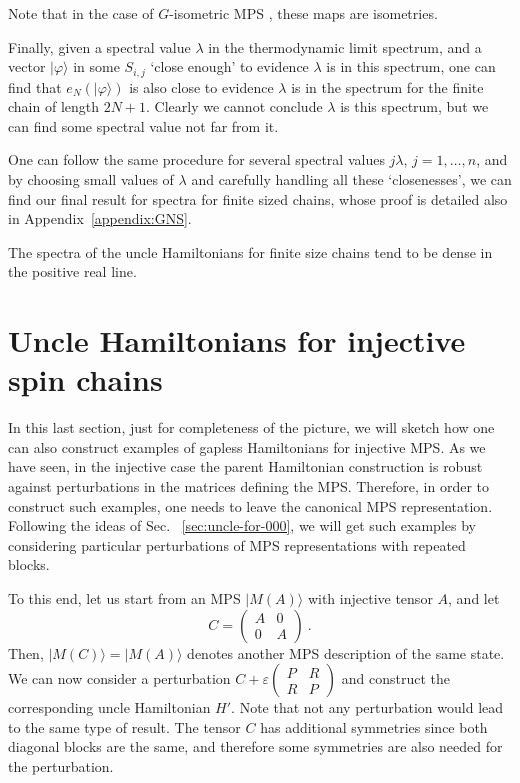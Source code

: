 \documentclass[cmp]{svjour}
\newcommand{\ket}[1]{|#1\rangle}
\begin{document}
Note that in the case of $G$-isometric MPS \cite{schuch:peps-sym}, these maps are isometries.




Finally, given a spectral value $\lambda$ in the thermodynamic limit spectrum, and a vector $\ket{\varphi}$ in some $S_{i,j}$ `close enough' to evidence $\lambda$ is in this spectrum, one can find that $e_N(\ket{\varphi})$ is also close to evidence $\lambda$ is in the spectrum for the finite chain of length $2N+1$. Clearly we cannot conclude $\lambda$ is this spectrum, but we can find some spectral value not far from it.

One can follow the same procedure for several spectral values $j\lambda$, $j=1,\dots,n$, and by choosing small values of $\lambda$ and carefully handling all these `closenesses', we can find our final result for spectra for finite sized chains, whose proof is detailed also in Appendix~\ref{appendix:GNS}.

\begin{theorem}\label{thm:finitesizespectra}
    The spectra of the uncle Hamiltonians for finite size chains tend to be dense in the positive real line.
\end{theorem}



\section{Uncle Hamiltonians for injective spin chains}\label{sec:injectiveMPS}

In this last section, just for completeness of the picture, we will sketch how one can also construct examples of gapless Hamiltonians for injective MPS. As we have seen, in the injective case the parent Hamiltonian construction is robust against perturbations in the matrices defining the MPS. Therefore, in order to construct such examples, one needs to leave the canonical MPS representation. Following the ideas of Sec. ~\ref{sec:uncle-for-000}, we will get such examples by considering particular perturbations of MPS representations with repeated blocks.

To this end, let us start
from an MPS $\ket{M(A)}$ with injective tensor $A$, and let
\[
    C=\left( \begin{array}{cc} A & 0\\ 0 & A \end{array} \right)\ .
\]
Then, $\ket{M(C)}=\ket{M(A)}$ denotes another MPS description of the same
state.  We can now consider a perturbation $C+\varepsilon\left(
    \begin{array}{cc} P & R\\ R & P \end{array} \right)$ and construct the
corresponding uncle Hamiltonian $H'$. Note that not any perturbation would lead to the same type of result. The tensor $C$ has additional symmetries since both diagonal blocks are the same, and therefore some symmetries are also needed for the perturbation.
\end{document}
